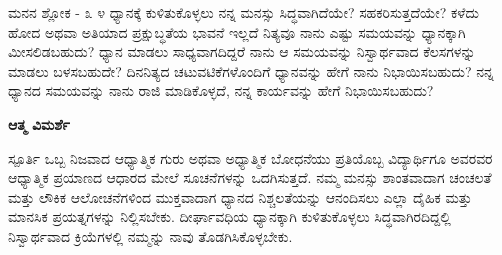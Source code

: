 \newpage
\begin{mananam}{\mananamfont \large{ಮನನ ಶ್ಲೋಕ - ೩ ೪}}
\mananamtext ಧ್ಯಾನಕ್ಕೆ ಕುಳಿತುಕೊಳ್ಳಲು ನನ್ನ ಮನಸ್ಸು ಸಿದ್ಧವಾಗಿದೆಯೇ? ಸಹಕರಿಸುತ್ತದೆಯೇ? ಕಳೆದು ಹೋದ ಅಥವಾ ಅತಿಯಾದ ಪ್ರಕ್ಷುಬ್ಧತೆಯ   ಭಾವನೆ ಇಲ್ಲದೆ ನಿತ್ಯವೂ ನಾನು ಎಷ್ಟು ಸಮಯವನ್ನು ಧ್ಯಾನಕ್ಕಾಗಿ ಮೀಸಲಿಡಬಹುದು? ಧ್ಯಾನ ಮಾಡಲು ಸಾಧ್ಯವಾಗದಿದ್ದರೆ ನಾನು ಆ ಸಮಯವನ್ನು ನಿಸ್ವಾರ್ಥವಾದ ಕೆಲಸಗಳನ್ನು ಮಾಡಲು ಬಳಸಬಹುದೇ? ದಿನನಿತ್ಯದ ಚಟುವಟಿಕೆಗಳೊಂದಿಗೆ ಧ್ಯಾನವನ್ನು ಹೇಗೆ ನಾನು ನಿಭಾಯಿಸಬಹುದು? ನನ್ನ ಧ್ಯಾನದ ಸಮಯವನ್ನು ನಾನು ರಾಜಿ ಮಾಡಿಕೊಳ್ಳದೆ, ನನ್ನ ಕಾರ್ಯವನ್ನು ಹೇಗೆ ನಿಭಾಯಿಸಬಹುದು?
\end{mananam}
\WritingHand\enspace\textbf{ಆತ್ಮ ವಿಮರ್ಶೆ}\\
\begin{inspiration}{\mananamfont \large ಸ್ಪೂರ್ತಿ}
ಒಬ್ಬ ನಿಜವಾದ ಆಧ್ಯಾತ್ಮಿಕ ಗುರು ಅಥವಾ ಅಧ್ಯಾತ್ಮಿಕ ಬೋಧನೆಯು ಪ್ರತಿಯೊಬ್ಬ ವಿದ್ಯಾರ್ಥಿಗೂ ಅವರವರ ಆಧ್ಯಾತ್ಮಿಕ ಪ್ರಯಾಣದ ಆಧಾರದ ಮೇಲೆ ಸೂಚನೆಗಳನ್ನು ಒದಗಿಸುತ್ತದೆ. ನಮ್ಮ ಮನಸ್ಸು ಶಾಂತವಾದಾಗ ಚಂಚಲತೆ ಮತ್ತು ಲೌಕಿಕ ಆಲೋಚನೆಗಳಿಂದ ಮುಕ್ತವಾದಾಗ ಧ್ಯಾನದ ನಿಶ್ಚಲತೆಯನ್ನು ಆನಂದಿಸಲು ಎಲ್ಲಾ ದೈಹಿಕ ಮತ್ತು ಮಾನಸಿಕ ಪ್ರಯತ್ನಗಳನ್ನು ನಿಲ್ಲಿಸಬೇಕು. ದೀರ್ಘಾವಧಿಯ ಧ್ಯಾನಕ್ಕಾಗಿ ಕುಳಿತುಕೊಳ್ಳಲು ಸಿದ್ಧವಾಗಿರದಿದ್ದಲ್ಲಿ ನಿಸ್ವಾರ್ಥವಾದ ಕ್ರಿಯೆಗಳಲ್ಲಿ ನಮ್ಮನ್ನು ನಾವು ತೊಡಗಿಸಿಕೊಳ್ಳಬೇಕು.
\end{inspiration}
\newpage


